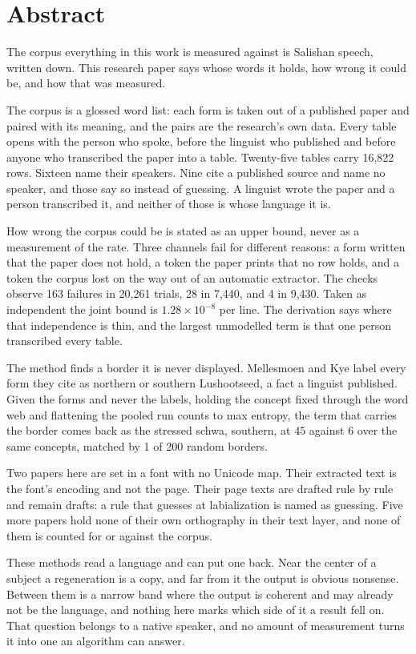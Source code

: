 \chapter*{Abstract}

The corpus everything in this work is measured against is Salishan speech, written down. This research paper
says whose words it holds, how wrong it could be, and how that was measured.

The corpus is a glossed word list: each form is taken out of a published paper and paired with its
meaning, and the pairs are the research's own data. Every table opens with the person who spoke,
before the linguist who published and before anyone who transcribed the paper into a table.
Twenty-five tables carry 16,822 rows. Sixteen name their speakers. Nine cite a published source and
name no speaker, and those say so instead of guessing. A linguist wrote the paper and a person transcribed it, and
neither of those is whose language it is.

How wrong the corpus could be is stated as an upper bound, never as a measurement of the rate.
Three channels fail for different reasons: a form written that the paper does not hold, a token the
paper prints that no row holds, and a token the corpus lost on the way out of an automatic extractor.
The checks observe 163 failures in 20,261 trials, 28 in 7,440, and 4 in 9,430. Taken as independent
the joint bound is $1.28 \times 10^{-8}$ per line. The derivation says where that independence is
thin, and the largest unmodelled term is that one person transcribed every table.

The method finds a border it is never displayed. Mellesmoen and Kye label every form they cite as
northern or southern Lushootseed, a fact a linguist published. Given the forms and never the labels,
holding the concept fixed through the word web and flattening the pooled run counts to max
entropy, the term that carries the border comes back as the stressed schwa, southern, at 45 against 6
over the same concepts, matched by 1 of 200 random borders.

Two papers here are set in a font with no Unicode map. Their extracted text is the font's encoding
and not the page. Their page texts are drafted rule by rule and remain drafts: a rule that guesses at
labialization is named as guessing. Five more papers hold none of their own orthography in their
text layer, and none of them is counted for or against the corpus.

These methods read a language and can put one back. Near the center of a subject a regeneration is
a copy, and far from it the output is obvious nonsense. Between them is a narrow band where the
output is coherent and may already not be the language, and nothing here marks which side of it a
result fell on. That question belongs to a native speaker, and no amount of measurement turns it
into one an algorithm can answer.
\cleardoublepage
